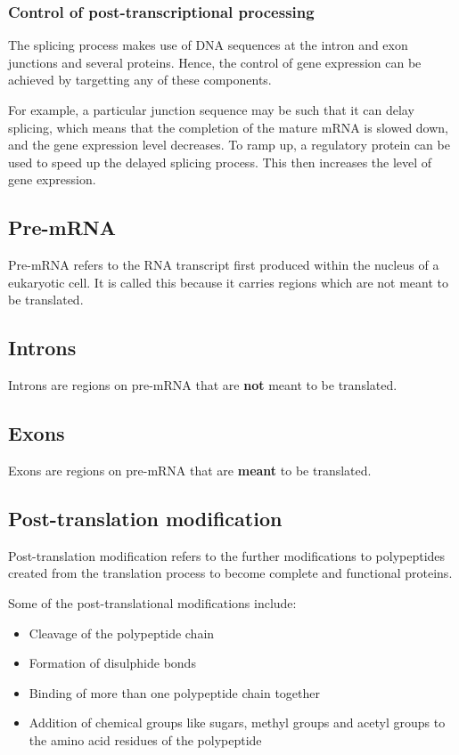 \documentclass[11pt]{article}
\begin{document}
\subsubsection{Control of post-transcriptional processing}
\label{sec:orgdc68030}
The splicing process makes use of DNA sequences at the intron and exon junctions and several proteins. Hence, the control of gene expression can be achieved by targetting any of these components.


For example, a particular junction sequence may be such that it can delay splicing, which means that the completion of the mature mRNA is slowed down, and the gene expression level decreases. To ramp up, a regulatory protein can be used to speed up the delayed splicing process. This then increases the level of gene expression.
\subsection{Pre-mRNA}
\label{sec:orgcb7bdc7}
Pre-mRNA refers to the RNA transcript first produced within the nucleus of a eukaryotic cell. It is called this because it carries regions which are not meant to be translated.
\subsection{Introns}
\label{sec:orga22fc2e}
Introns are regions on pre-mRNA that are \textbf{not} meant to be translated.
\subsection{Exons}
\label{sec:org59a587f}
Exons are regions on pre-mRNA that are \textbf{meant} to be translated.
\subsection{Post-translation modification}
\label{sec:org515520a}
Post-translation modification refers to the further modifications to polypeptides created from the translation process to become complete and functional proteins.


Some of the post-translational modifications include:
\begin{itemize}
\item Cleavage of the polypeptide chain
\item Formation of disulphide bonds
\item Binding of more than one polypeptide chain together
\item Addition of chemical groups like sugars, methyl groups and acetyl groups to the amino acid residues of the polypeptide
\end{itemize}
\end{document}
